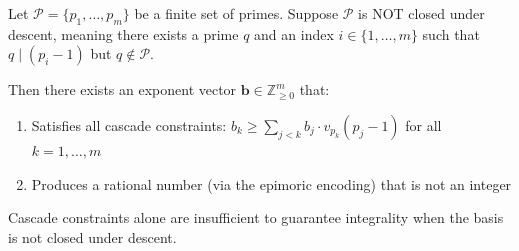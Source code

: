 \begin{lemma}
\label{lem:descent-necessity}

Let $\mathcal{P} = \{p_1, \ldots, p_m\}$ be a finite set of primes. Suppose $\mathcal{P}$ is NOT closed under descent, meaning there exists a prime $q$ and an index $i \in \{1, \ldots, m\}$ such that $q \mid (p_i - 1)$ but $q \notin \mathcal{P}$.

Then there exists an exponent vector $\mathbf{b} \in \mathbb{Z}_{\geq 0}^m$ that:
\begin{enumerate}
\item Satisfies all cascade constraints: $b_k \geq \sum_{j < k} b_j \cdot v_{p_k}(p_j - 1)$ for all $k = 1, \ldots, m$
\item Produces a rational number (via the epimoric encoding) that is not an integer
\end{enumerate}

Cascade constraints alone are insufficient to guarantee integrality when the basis is not closed under descent.

\end{lemma}

